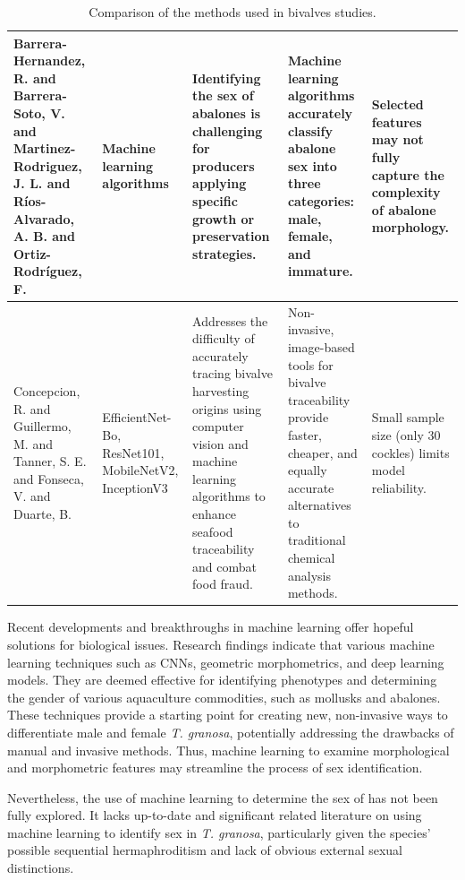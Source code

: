 \begin{table}[]
\begin{adjustbox}{scale=0.55,center}
\begin{tabular}{|p{5cm}|p{5cm}|p{8cm}|p{8cm}|p{8cm}|}
		Barrera-Hernandez, R. and Barrera-Soto, V. and Martinez-Rodriguez, J. L. and Ríos-Alvarado, A. B. and Ortiz-Rodríguez, F. &
		Machine learning algorithms &
		Identifying the sex of abalones is challenging for producers applying specific growth or preservation strategies. &
		Machine learning algorithms accurately classify abalone sex into three categories: male, female, and immature. &
		Selected features may not fully capture the complexity of abalone morphology. \\ \hline
		
		Concepcion, R. and Guillermo, M. and Tanner, S. E. and Fonseca, V. and Duarte, B. &
		EfficientNet-Bo, ResNet101, MobileNetV2, InceptionV3 &
		Addresses the difficulty of accurately tracing bivalve harvesting origins using computer vision and machine learning algorithms to enhance seafood traceability and combat food fraud. &
		Non-invasive, image-based tools for bivalve traceability provide faster, cheaper, and equally accurate alternatives to traditional chemical analysis methods. &
		Small sample size (only 30 cockles) limits model reliability. \\ \hline
		
	\end{tabular}
	
	\end{adjustbox}
	\caption{Comparison of the methods used in bivalves studies.}
	\label{table:1}
\end{table}

\newpage

Recent developments and breakthroughs in machine learning offer hopeful solutions for biological issues. Research findings indicate that various machine learning techniques such as CNNs, geometric morphometrics, and deep learning models. They are deemed effective for identifying phenotypes and determining the gender of various aquaculture commodities, such as mollusks and abalones. These techniques provide a starting point for creating new, non-invasive ways to differentiate male and female \textit{T. granosa}, potentially addressing the drawbacks of manual and invasive methods. Thus, machine learning to examine morphological and morphometric features may streamline the process of sex identification.

Nevertheless, the use of machine learning to determine the sex of \Tgranosa has not been fully explored. It lacks up-to-date and significant related literature on using machine learning to identify sex in \textit{T. granosa}, particularly given the species’ possible sequential hermaphroditism and lack of obvious external sexual distinctions.










